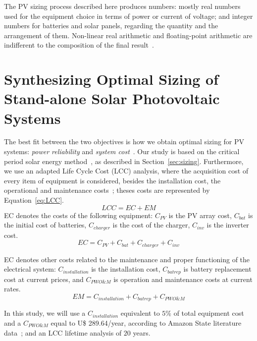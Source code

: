 \documentclass[review]{elsarticle}
\begin{document}
The PV sizing process described here produces numbers: mostly real numbers used for the equipment choice in terms of power or current of voltage; and integer numbers for batteries and solar panels, regarding the quantity and the arrangement of them. Non-linear real arithmetic and floating-point arithmetic are indifferent to the composition of the final result~\citep{DBLP:journals/corr/abs-2004-12699}.

\section{Synthesizing Optimal Sizing of Stand-alone Solar Photovoltaic Systems}
\label{sec:SynthesizingOptimalSolarPhotovoltaicSystems}
The best fit between the two objectives is how we obtain optimal sizing for PV systems: \textit{power reliability} and \textit{system cost}~\citep{Alsadi2018}. Our study is based on the critical period solar energy method~\citep{Pinho}, as described in Section~\ref{sec:sizing}. Furthermore, we use an adapted Life Cycle Cost (LCC) analysis, where the acquisition cost of every item of equipment is considered, besides the installation cost, the operational and maintenance costs~\citep{Alsadi2018}; theses costs are represented by Equation~\ref{eq:LCC}.
%
\begin{equation}
\label{eq:LCC}
LCC = EC + EM
\end{equation}
%
\noindent EC denotes the costs of the following equipment: $C_{PV}$ is the PV array cost, $C_{bat}$ is the initial cost of batteries, $C_{charger}$ is the cost of the charger, $C_{inv}$ is the inverter cost.
\begin{equation}
\label{eq:EquipamentCost}
EC = C_{PV} + C_{bat} + C_{charger} + C_{inv}
\end{equation}

EC denotes other costs related to the maintenance and proper functioning of the electrical system: $C_{installation}$ is the installation cost, $C_{batrep}$ is battery replacement cost at current prices, and $C_{PWO\&M}$ is operation and maintenance costs at current rates.
\begin{equation}
\label{eq:EquipamentMaintenence}
EM = C_{installation} + C_{batrep} + C_{PWO\&M}
\end{equation}

In this study, we will use a $C_{installation}$ equivalent to $5$\% of total equipment cost and a $C_{PWO\&M}$ equal to U\$ 289.64/year, according to Amazon State literature data~\citep{Agrener2013}; and an LCC lifetime analysis of $20$ years.
\end{document}
